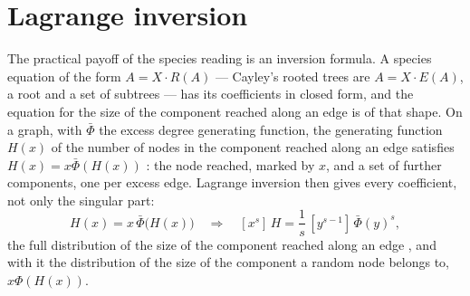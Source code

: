 \section{Lagrange inversion}
\label{sec:sp-lagrange}

The practical payoff of the species reading is an inversion formula. A
species equation of the form $A=X\cdot R(A)$ --- Cayley's rooted trees are
$A=X\cdot E(A)$, a root and a set of subtrees --- has its coefficients in
closed form, and the equation for the size of the component reached along an
edge is of that shape. On a graph, with $\bar\Phi$ the excess degree
generating function, the generating function $H(x)$ of the number of nodes
in the component reached along an edge satisfies $H(x)=x\bar\Phi(H(x))$
\citep{newman2001}: the node reached, marked by $x$, and a set of further
components, one per excess edge. Lagrange inversion then gives every
coefficient, not only the singular part:
\begin{equation}
  H(x)=x\,\bar\Phi\bigl(H(x)\bigr)
  \quad\Longrightarrow\quad
  [x^{s}]\,H=\frac{1}{s}\,[y^{s-1}]\,\bar\Phi(y)^{s},
  \label{eq:sp-lagrange}
\end{equation}
the full distribution of the size of the component reached along an edge
\citep{bergeron1998}, and with it the distribution of the size of
the component a random node belongs to, $x\Phi(H(x))$.

